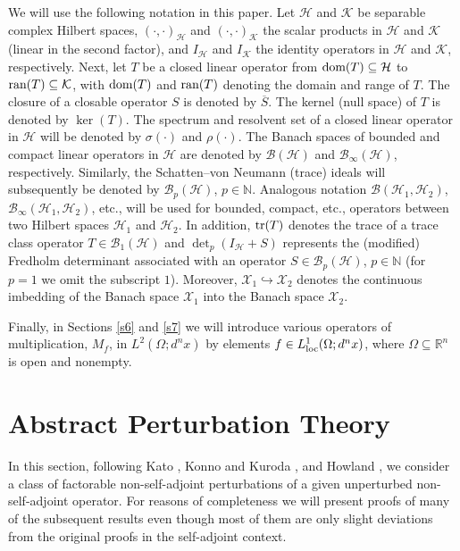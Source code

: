 \documentclass[reqno,10pt, centertags]{amsart}
\newcommand{\bbN}{{\mathbb{N}}}
\newcommand{\bbR}{{\mathbb{R}}}
\newcommand{\cB}{{\mathcal B}}
\newcommand{\cH}{{\mathcal H}}
\newcommand{\cK}{{\mathcal K}}
\newcommand{\cX}{{\mathcal X}}
\newcommand{\lb}{\label}
\newcommand{\ol}{\overline}
\newcommand{\Om}{\Omega}
\newcommand{\loc}{\text{\rm{loc}}}
\newcommand{\tr}{\text{\rm{tr}}}
\newcommand{\ran}{\text{\rm{ran}}}
\newcommand{\dom}{\text{\rm{dom}}}
\numberwithin{equation}{section}
\theoremstyle{definition}
\begin{document}
We will use the following notation in this paper. Let $\cH$ and $\cK$
be separable complex Hilbert spaces, $(\cdot,\cdot)_{\cH}$ and
$(\cdot,\cdot)_{\cK}$ the scalar products in $\cH$ and $\cK$ (linear in
the second factor), and
$I_{\cH}$ and $I_{\cK}$ the identity operators in $\cH$ and $\cK$,
respectively. Next, let $T$ be a closed linear operator from
$\dom(T)\subseteq\cH$ to $\ran(T)\subseteq\cK$, with $\dom(T)$
and $\ran(T)$ denoting the domain and range of $T$. The closure of a
closable operator $S$ is denoted by $\ol S$. The kernel (null space) of $T$
is denoted by
$\ker(T)$. The spectrum and resolvent set of a closed linear operator in
$\cH$ will be denoted by
$\sigma(\cdot)$ and $\rho(\cdot)$. The Banach spaces of bounded
and compact linear operators in $\cH$ are denoted by $\cB(\cH)$ and
$\cB_\infty(\cH)$, respectively. Similarly, the Schatten--von Neumann
(trace) ideals will subsequently be denoted by $\cB_p(\cH)$,
$p\in\bbN$. Analogous notation $\cB(\cH_1,\cH_2)$,
$\cB_\infty (\cH_1,\cH_2)$, etc., will be used for bounded, compact, etc.,
operators between two Hilbert spaces $\cH_1$ and $\cH_2$. In addition,
$\tr(T)$ denotes the trace of a trace class operator $T\in\cB_1(\cH)$ and
$\det_{p}(I_{\cH}+S)$ represents the (modified) Fredholm determinant
associated with an operator $S\in\cB_p(\cH)$, $p\in\bbN$ (for $p=1$ we
omit the subscript $1$). Moreover,
$\cX_1 \hookrightarrow \cX_2$ denotes the continuous imbedding of the
Banach space $\cX_1$ into the Banach space $\cX_2$.

Finally, in Sections \ref{s6} and \ref{s7} we will introduce various
operators of multiplication, $M_f$, in $L^2(\Om;d^nx)$ by elements $f \in
L^1_{\loc}(\Om;d^nx)$, where $\Omega\subseteq\bbR^n$ is open and nonempty.

\section{Abstract Perturbation Theory} \lb{s2}

In this section, following Kato \cite{Ka66}, Konno and Kuroda
\cite{KK66}, and Howland \cite{Ho70}, we consider a class
of factorable non-self-adjoint perturbations of a given unperturbed
non-self-adjoint operator. For reasons of completeness we will
present proofs of many of the subsequent results even though most of
them are only slight deviations from the original proofs in the
self-adjoint context.
\end{document}
